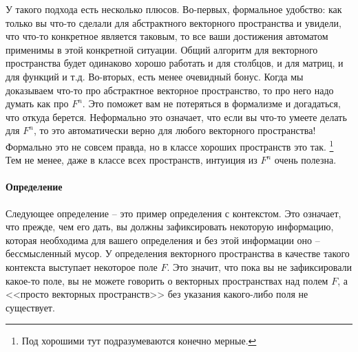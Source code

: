 У такого подхода есть несколько плюсов.
Во-первых, формальное удобство: как только вы что-то сделали для абстрактного векторного пространства и увидели, что что-то конкретное является таковым, то все ваши достижения автоматом применимы в этой конкретной ситуации.
Общий алгоритм для векторного пространства будет одинаково хорошо работать и для столбцов, и для матриц, и для функций и т.д.
Во-вторых, есть менее очевидный бонус.
Когда мы доказываем что-то про абстрактное векторное пространство, то про него надо думать как про $F^n$.
Это поможет вам не потеряться в формализме и догадаться, что откуда берется.
Неформально это означает, что если вы что-то умеете делать для $F^n$, то это автоматически верно для любого векторного пространства!
Формально это не совсем правда, но в классе хороших пространств это так.%
\footnote{Под хорошими тут подразумеваются конечно мерные.}
Тем не менее, даже в классе всех пространств, интуиция из $F^n$ очень полезна.

\paragraph{Определение}

Следующее определение -- это пример определения с контекстом.
Это означает, что прежде, чем его дать, вы должны зафиксировать некоторую информацию, которая необходима для вашего определения и без этой информации оно -- бессмысленный мусор.
У определения векторного пространства в качестве такого контекста выступает некоторое поле $F$.
Это значит, что пока вы не зафиксировали какое-то поле, вы не можете говорить о векторных пространствах над полем $F$, а <<просто векторных пространств>> без указания какого-либо поля не существует.

